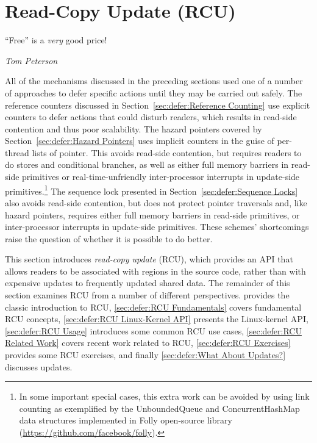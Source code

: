 
\section{Read-Copy Update (RCU)}
\label{sec:defer:Read-Copy Update (RCU)}
%
\epigraph{``Free'' is a \emph{very} good price!}{\emph{Tom Peterson}}

All of the mechanisms discussed in the preceding sections
used one of a number of approaches to defer specific actions
until they may be carried out safely.
The reference counters discussed in
Section~\ref{sec:defer:Reference Counting}
use explicit counters to defer actions that could disturb readers,
which results in read-side contention and thus poor scalability.
The hazard pointers covered by
Section~\ref{sec:defer:Hazard Pointers}
uses implicit counters in the guise of per-thread lists of pointer.
This avoids read-side contention, but requires readers to do stores and
conditional branches, as well as either full memory barriers in read-side
primitives or real-time-unfriendly inter-processor interrupts in
update-side primitives.\footnote{
	In some important special cases, this extra work can be avoided
	by using link counting as exemplified by the UnboundedQueue
	and ConcurrentHashMap data structures implemented in Folly
	open-source library
	(\url{https://github.com/facebook/folly}).}
The sequence lock presented in
Section~\ref{sec:defer:Sequence Locks}
also avoids read-side contention, but does not protect pointer
traversals and, like hazard pointers, requires either full memory barriers
in read-side primitives, or inter-processor interrupts in update-side
primitives.
These schemes' shortcomings raise the question of
whether it is possible to do better.

This section introduces \emph{read-copy update} (RCU), which provides
an API that allows readers to be associated with regions in the source code,
rather than with expensive updates to frequently updated shared data.
The remainder of this
section examines RCU from a number of different perspectives.
 provides the classic
introduction to RCU,
\cref{sec:defer:RCU Fundamentals} covers fundamental RCU
concepts,
\cref{sec:defer:RCU Linux-Kernel API} presents the Linux-kernel
API,
\cref{sec:defer:RCU Usage} introduces some common RCU use cases,
\cref{sec:defer:RCU Related Work} covers recent work related
to RCU,
\cref{sec:defer:RCU Exercises} provides some RCU exercises,
and finally
\cref{sec:defer:What About Updates?}
discusses updates.






